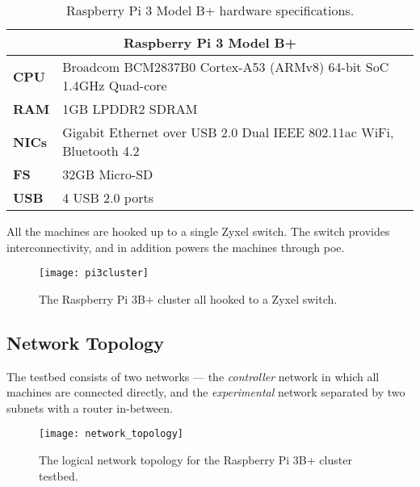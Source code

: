 \begin{wraptable}{r}{5cm}
    \begin{tabular}{ |p{1cm}|p{3cm}| }
        \hline
        \multicolumn{2}{|c|}{\textbf{Raspberry Pi 3 Model B+}} \\
        \hline
        \textbf{CPU} & Broadcom BCM2837B0 \newline Cortex-A53 (ARMv8) 64-bit SoC 1.4GHz Quad-core \\
        \hline
        \textbf{RAM} & 1GB LPDDR2 SDRAM \\
        \hline
        \textbf{NICs} & Gigabit Ethernet over USB 2.0 \newline Dual IEEE 802.11ac WiFi, Bluetooth 4.2 \\
        \hline
        \textbf{FS} & 32GB Micro-SD \\
        \hline
        \textbf{USB} & 4 USB 2.0 ports \\
        \hline
    \end{tabular}
    \caption{Raspberry Pi 3 Model B+ hardware specifications.}
\end{wraptable}

All the machines are hooked up to a single Zyxel switch. The switch provides interconnectivity, and in addition powers the machines through \gls{poe}.

\begin{figure}[H]
    \texttt{[image: pi3cluster]}
    \captionsetup{width=1.0\linewidth,justification=raggedright,singlelinecheck=false}
    \caption{The Raspberry Pi 3B+ cluster all hooked to a Zyxel switch.}
    \label{fig:pi3cluster}
\end{figure}

\clearpage




\subsection{Network Topology} \label{network_topology}

The testbed consists of two networks --- the \textit{controller} network in which all machines are connected directly, and the \textit{experimental} network separated by two subnets with a router in-between.

\begin{figure}[H]
    \centering
    \texttt{[image: network\_topology]}
    \captionsetup{width=0.6\linewidth}
    \caption{The logical network topology for the Raspberry Pi 3B+ cluster testbed.}
    \label{fig:network_topology}
\end{figure}

